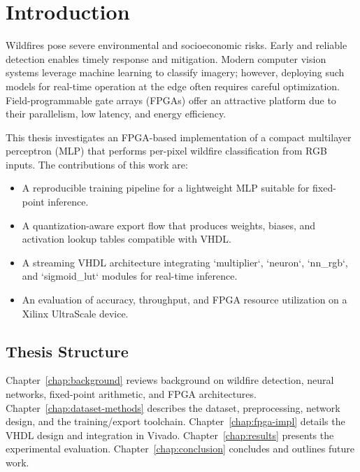 \chapter{Introduction}
Wildfires pose severe environmental and socioeconomic risks. Early and reliable detection enables timely response and mitigation. Modern computer vision systems leverage machine learning to classify imagery; however, deploying such models for real-time operation at the edge often requires careful optimization. Field-programmable gate arrays (FPGAs) offer an attractive platform due to their parallelism, low latency, and energy efficiency.

This thesis investigates an FPGA-based implementation of a compact multilayer perceptron (MLP) that performs per-pixel wildfire classification from RGB inputs. The contributions of this work are:
\begin{itemize}
    \item A reproducible training pipeline for a lightweight MLP suitable for fixed-point inference.
    \item A quantization-aware export flow that produces weights, biases, and activation lookup tables compatible with VHDL.
    \item A streaming VHDL architecture integrating `multiplier`, `neuron`, `nn\_rgb`, and `sigmoid\_lut` modules for real-time inference.
    \item An evaluation of accuracy, throughput, and FPGA resource utilization on a Xilinx UltraScale device.
\end{itemize}

\section{Thesis Structure}
Chapter~\ref{chap:background} reviews background on wildfire detection, neural networks, fixed-point arithmetic, and FPGA architectures. Chapter~\ref{chap:dataset-methods} describes the dataset, preprocessing, network design, and the training/export toolchain. Chapter~\ref{chap:fpga-impl} details the VHDL design and integration in Vivado. Chapter~\ref{chap:results} presents the experimental evaluation. Chapter~\ref{chap:conclusion} concludes and outlines future work.
